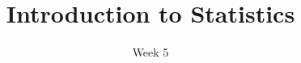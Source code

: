 \title{Introduction to Statistics}
\date{Week 5}





\thispagestyle{plain}
\graphicspath{{lectures/week05/}}




